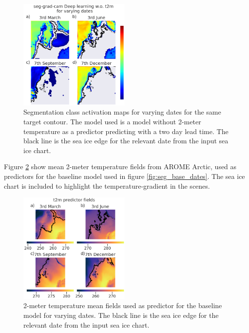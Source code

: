 \documentclass[../main/thesis.tex]{subfiles}
\begin{document}
\begin{figure}
    \centering
    \includegraphics[width=0.49\textwidth]{not2m_dates}
    \caption{\label{fig:seg_not2m_dates}Segmentation class activation maps for varying dates for the same target contour. The model used is a model without 2-meter temperature as a predictor predicting with a two day lead time. The black line is the sea ice edge for the relevant date from the input sea ice chart.}
\end{figure}

Figure \ref{fig:t2m_dates} show mean 2-meter temperature fields from AROME Arctic, used as predictors for the baseline model used in figure \ref{fig:seg_base_dates}. The sea ice chart is included to highlight the temperature-gradient in the scenes.

\begin{figure}
    \centering
    \includegraphics[width=0.49\textwidth]{t2m}
    \caption{\label{fig:t2m_dates}2-meter temperature mean fields used as predictor for the baseline model for varying dates. The black line is the sea ice edge for the relevant date from the input sea ice chart.}
\end{figure}
\end{document}
